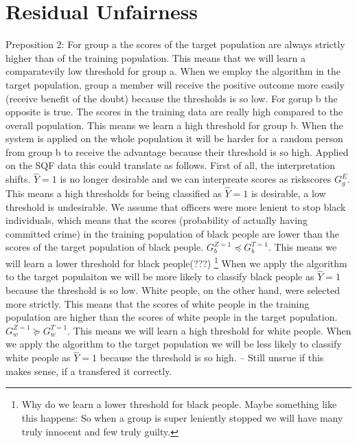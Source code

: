 \section*{Residual Unfairness}
Preposition 2:
For group a the scores of the target population are always strictly higher than
of the training population. This means that we will learn a comparatevily low threshold for group a.
When we employ the algorithm in the target population, group a member will receive the positive outcome
 more easily (receive benefit of the doubt) because the thresholds is so low. For gorup b
 the opposite is true. The scores in the training data are really high compared to the overall population.
 This means we learn a high threshold for group b. When the system is applied on the whole population it will
 be harder for a random person from group b to receive the advantage because their threshold is so high.
Applied on the SQF data this could translate as follows. First of all, the interpretation shifts. $\hat{Y} = 1$ is 
no longer desirable and we can interpreate scores as riskscores $G_g^{E}$. This means a high thresholds for being classified as $\hat{Y} = 1$ is desirable, a low
threshold is undesirable. We assume that officers were more lenient to stop black individuals, which means that the scores (probability of actually having committed crime) in the training population
of black people are lower than the scores of the target population of black people.
$G_b^{Z=1} \preceq G_b^{T=1}$. This means we will learn a lower threshold for black people(???) \footnote{Why do we learn a lower threshold for black people. Maybe something like this happens: So when a group is super leniently stopped we will have many truly innocent and few truly guilty.}
When we apply the algorithm to the target populaiton we will be more likely to classify black people as $\hat{Y} = 1$ because the threshold is so low. White people, on the other hand,
were selected more strictly. This means that the scores of white people in the training population are higher than the scores of white people in the target population.
$G_w^{Z=1} \succeq G_w^{T=1}$. This means we will learn a high threshold for white people. When we apply the algorithm to the target population we will be less likely to classify white
people as $\hat{Y} = 1$ because the threshold is so high. -- Still unsrue if this makes sense, if a transfered it correctly.

